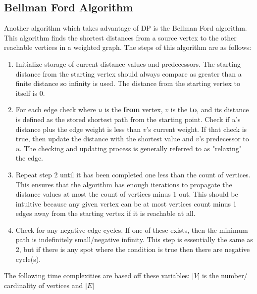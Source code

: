 \documentclass[letterpaper, 10pt]{article}
\begin{document}
\subsection{Bellman Ford Algorithm}
Another algorithm which takes advantage of DP is the Bellman Ford algorithm. This algorithm finds the shortest distances
from a source vertex to the other reachable vertices in a weighted graph. The steps of this algorithm are as follows:\\
\begin{enumerate}
  \item Initialize storage of current distance values and predecessors. The starting distance from the starting vertex should always compare as greater than a finite distance so infinity is used. The distance from the starting vertex to itself is 0.
  
  
  
  \item For each edge check where $u$ is the \textbf{from} vertex, $v$ is the \textbf{to}, and its distance is defined as the stored shortest path from the starting point. Check if $u$'s distance plus the edge weight is less than $v$'s current weight. If that check is true, then update the distance with the shortest value and $v$'s predecessor to $u$. The checking and updating process is generally referred to as "relaxing" the edge.
  
  
  
  \item Repeat step 2 until it has been completed one less than the count of vertices. This ensures that the algorithm has enough iterations to propagate the distance values at most the count of vertices minus 1 out. This should be intuitive because any given vertex can be at most vertices count minus 1 edges away from the starting vertex if it is reachable at all.
  
  \item Check for any negative edge cycles. If one of these exists, then the minimum path is indefinitely small/negative infinity. This step is essentially the same as 2, but if there is any spot where the condition is true then there are negative cycle(s).
  
  
\end{enumerate}
The following time complexities are based off these variables: \(|V|\) is the number/ cardinality of vertices and \(|E|\)
\end{document}
